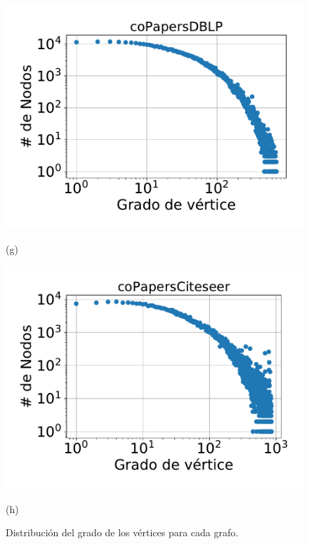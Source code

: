\begin{figure}
    	\begin{minipage}{1\textwidth}
    		\centering
    		\begin{minipage}{0.45\textwidth}
    			\centering
    			\includegraphics[width=1\linewidth]{img/grades/coPapersDBLP.pdf}
    			
    			(g)
    		\end{minipage}
    		\begin{minipage}{0.45\textwidth}
    			\centering
    			\includegraphics[width=1\linewidth]{img/grades/coPapersCiteseer.pdf}
    			
    			(h)
    		\end{minipage}  
    	\end{minipage}
    	
%    		
    \caption{Distribución del grado de los vértices para cada grafo.}
    \label{fig:grades}
\end{figure}
